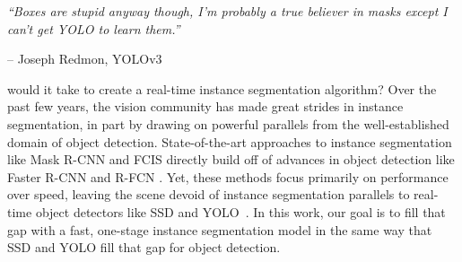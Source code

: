 \documentclass[10pt,journal,compsoc]{IEEEtran}
\begin{document}
\maketitle

\IEEEdisplaynontitleabstractindextext




\IEEEpeerreviewmaketitle




\emph{``Boxes are stupid anyway though, I'm probably a true believer in masks except I can't get YOLO to learn them.''}
\begin{flushright}
      -- Joseph Redmon, YOLOv3~\cite{yolov3}
\end{flushright}

 would it take to create a real-time instance segmentation algorithm? Over the past few years, the vision community has made great strides in instance segmentation, in part by drawing on powerful parallels from the well-established domain of object detection. State-of-the-art approaches to instance segmentation like Mask R-CNN \cite{maskrcnn} and FCIS \cite{fcis} directly build off of advances in object detection like Faster R-CNN \cite{fasterrcnn} and R-FCN \cite{rfcn}. Yet, these methods focus primarily on performance over speed, leaving the scene devoid of instance segmentation parallels to real-time object detectors like SSD \cite{ssd} and YOLO~\cite{yolov2, yolov3}. In this work, our goal is to fill that gap with a fast, one-stage instance segmentation model in the same way that SSD and YOLO fill that gap for object detection.
\end{document}
